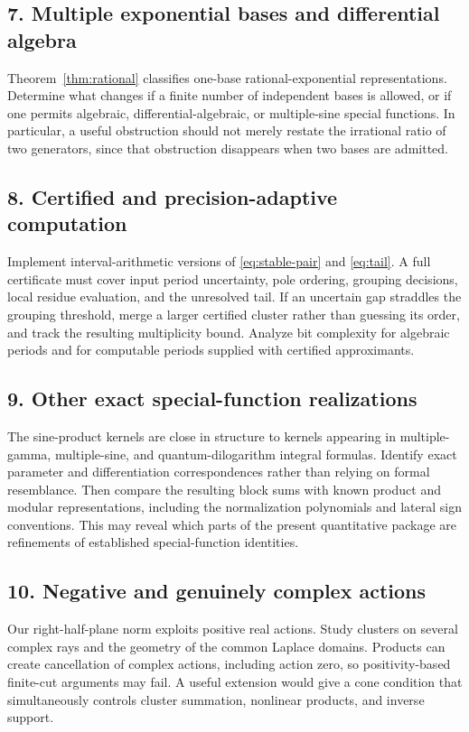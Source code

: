 \documentclass[11pt,a4paper]{article}
\numberwithin{equation}{section}
\theoremstyle{definition}
\theoremstyle{remark}
\begin{document}
\subsection*{7. Multiple exponential bases and differential algebra}
Theorem~\ref{thm:rational} classifies one-base rational-exponential
representations. Determine what changes if a finite number of independent
bases is allowed, or if one permits algebraic, differential-algebraic,
or multiple-sine special functions. In particular, a useful obstruction
should not merely restate the irrational ratio of two generators, since
that obstruction disappears when two bases are admitted.

\subsection*{8. Certified and precision-adaptive computation}
Implement interval-arithmetic versions of \eqref{eq:stable-pair} and
\eqref{eq:tail}. A full certificate must cover input period uncertainty,
pole ordering, grouping decisions, local residue evaluation, and the
unresolved tail. If an uncertain gap straddles the grouping threshold,
merge a larger certified cluster rather than guessing its order, and
track the resulting multiplicity bound. Analyze bit complexity for
algebraic periods and for computable periods supplied with certified
approximants.

\subsection*{9. Other exact special-function realizations}
The sine-product kernels are close in structure to kernels appearing in
multiple-gamma, multiple-sine, and quantum-dilogarithm integral formulas.
Identify exact parameter and differentiation correspondences rather than
relying on formal resemblance. Then compare the resulting block sums with
known product and modular representations, including the normalization
polynomials and lateral sign conventions. This may reveal which parts of
the present quantitative package are refinements of established
special-function identities.

\subsection*{10. Negative and genuinely complex actions}
Our right-half-plane norm exploits positive real actions. Study clusters
on several complex rays and the geometry of the common Laplace domains.
Products can create cancellation of complex actions, including action
zero, so positivity-based finite-cut arguments may fail. A useful
extension would give a cone condition that simultaneously controls
cluster summation, nonlinear products, and inverse support.
\end{document}
